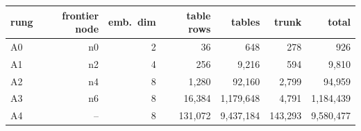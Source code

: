 \begin{tabular}{lrrrrrr}
\toprule
rung & frontier node & emb.\ dim & table rows & tables & trunk & total\\
\midrule
A0 & n0 & 2 & 36 & 648 & 278 & 926\\
A1 & n2 & 4 & 256 & 9{,}216 & 594 & 9{,}810\\
A2 & n4 & 8 & 1{,}280 & 92{,}160 & 2{,}799 & 94{,}959\\
A3 & n6 & 8 & 16{,}384 & 1{,}179{,}648 & 4{,}791 & 1{,}184{,}439\\
A4 & -- & 8 & 131{,}072 & 9{,}437{,}184 & 143{,}293 & 9{,}580{,}477\\
\bottomrule
\end{tabular}
